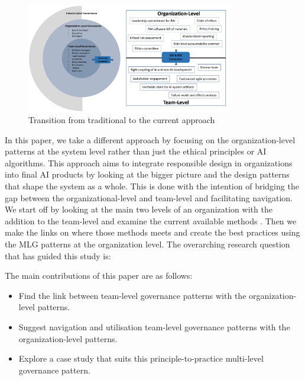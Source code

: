 \documentclass[conference]{IEEEtran}
\begin{document}
\begin{figure}[htbp!!]
	\centering
	\includegraphics[width=0.8\textwidth]{Organization.png}
	\caption{Transition from traditional to the current approach}
	\label{XAIRAIorg}
\end{figure}
In this paper, we take a different approach by focusing on the organization-level patterns at the system level rather than just the ethical principles or AI algorithms. This approach aims to integrate responsible design in organizations into final AI products by looking at the bigger picture and the design patterns that shape the system as a whole. This is done with the intention of bridging the gap between the organizational-level and team-level and facilitating navigation. We start off by looking at the main two levels of an organization with the addition to the team-level and examine the current available methods \cite{Shneiderman, ShneidermanRespo, Jana, Hussain, roadmap}. Then we make the links on where those methods meets and create the best practices using the MLG patterns at the organization level. The overarching research question that has guided this study is:


\vskip 0.1in
\vskip 0.1in

\noindent{}

\vskip 0.1in
\vskip 0.1in

The main contributions of this paper are as follows:
\begin{itemize}
\item Find the link between team-level governance patterns with the organization-level patterns.
\item Suggest navigation and utilisation team-level governance patterns with the organization-level patterns.
\item Explore a case study that suits this principle-to-practice multi-level governance pattern.
\end{itemize}
\smallskip
\end{document}
